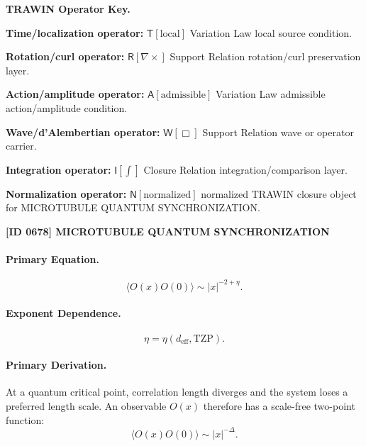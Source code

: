 \par\vspace{0.45\baselineskip}
\noindent\begin{minipage}[t]{\linewidth}
\begingroup
\small
\raggedright
\textbf{TRAWIN Operator Key.}\par
\noindent\textbf{Time/localization operator:} $\mathsf{T}\!\left[\mathrm{local}\right]$ Variation Law local source condition.\par
\noindent\textbf{Rotation/curl operator:} $\mathsf{R}\!\left[\nabla\times\right]$ Support Relation rotation/curl preservation layer.\par
\noindent\textbf{Action/amplitude operator:} $\mathsf{A}\!\left[\mathrm{admissible}\right]$ Variation Law admissible action/amplitude condition.\par
\noindent\textbf{Wave/d'Alembertian operator:} $\mathsf{W}\!\left[\Box\right]$ Support Relation wave or operator carrier.\par
\noindent\textbf{Integration operator:} $\mathsf{I}\!\left[\int\right]$ Closure Relation integration/comparison layer.\par
\noindent\textbf{Normalization operator:} $\mathsf{N}\!\left[\mathrm{normalized}\right]$ normalized TRAWIN closure object for MICROTUBULE QUANTUM SYNCHRONIZATION.\par
\endgroup
\end{minipage}

\clearpage
\noindent\textbf{[ID 0678] MICROTUBULE QUANTUM SYNCHRONIZATION}\par
\vspace{0.35em}
\paragraph{Primary Equation.}
\begin{equation}
\langle O(x)O(0)\rangle
\sim
|x|^{-2+\eta}.
\end{equation}

\paragraph{Exponent Dependence.}
\begin{equation}
\eta=\eta(d_{\mathrm{eff}},\mathrm{TZP}).
\end{equation}

\paragraph{Primary Derivation.}
At a quantum critical point, correlation length diverges and the system loses a preferred length scale.  
An observable $O(x)$ therefore has a scale-free two-point function:
\begin{equation}
\langle O(x)O(0)\rangle
\sim
|x|^{-\Delta}.
\end{equation}

